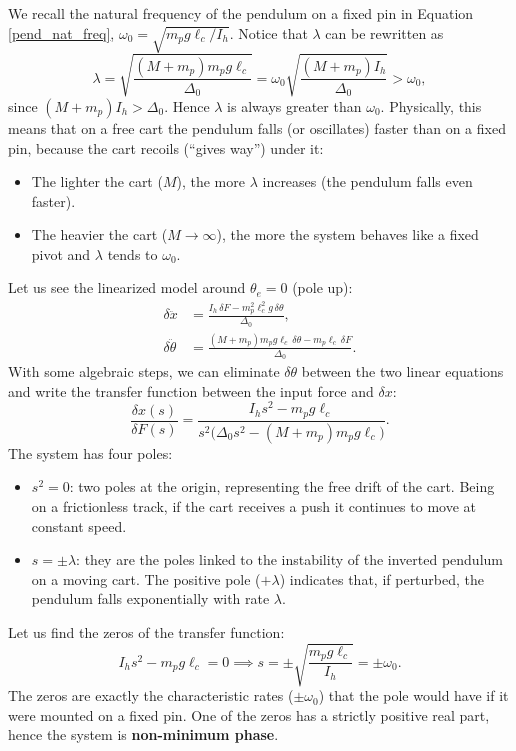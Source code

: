 \documentclass[10pt, a4paper]{report}
\begin{document}
We recall the natural frequency of the pendulum on a fixed pin in Equation \eqref{pend_nat_freq}, $\omega_0=\sqrt{m_pg\ell_c/I_h}$. Notice that $\lambda$ can be rewritten as
\begin{equation}
    \lambda = \sqrt{\frac{(M + m_p) m_p g \ell_c}{\Delta_0}} = \omega_0 \sqrt{\frac{(M + m_p) I_h}{\Delta_0}} > \omega_0 ,
\end{equation}
since $(M+m_p)I_h>\Delta_0$. Hence $\lambda$ is always greater than $\omega_0$. Physically, this means that on a free cart the pendulum falls (or oscillates) faster than on a fixed pin, because the cart recoils (``gives way'') under it:
\begin{itemize}
    \item The lighter the cart ($M$), the more $\lambda$ increases (the pendulum falls even faster).
    \item The heavier the cart ($M \to \infty$), the more the system behaves like a fixed pivot and $\lambda$ tends to $\omega_0$.
\end{itemize}
Let us see the linearized model around $\theta_e=0$ (pole up):
\begin{align}
\delta \ddot{x} &= \frac{I_h \, \delta F - m_p^2 \ell_c^2 g \, \delta \theta}{\Delta_0},\\
\delta \ddot{\theta} &= \frac{(M + m_p) m_p g \ell_c \, \delta \theta - m_p \ell_c \, \delta F}{\Delta_0}.
\end{align}
With some algebraic steps, we can eliminate $\delta\theta$ between the two linear equations and write the transfer function between the input force and $\delta x$:
\begin{equation}
    \frac{\delta x(s)}{\delta F(s)} = \frac{I_h s^2 - m_p g \ell_c}{s^2 \big(\Delta_0 s^2 - (M + m_p) m_p g \ell_c\big)}.
\end{equation}
The system has four poles:
\begin{itemize}
    \item $s^2=0$: two poles at the origin, representing the free drift of the cart. Being on a frictionless track, if the cart receives a push it continues to move at constant speed.
    \item $s=\pm\lambda$: they are the poles linked to the instability of the inverted pendulum on a moving cart. The positive pole ($+\lambda$) indicates that, if perturbed, the pendulum falls exponentially with rate $\lambda$.
\end{itemize}
Let us find the zeros of the transfer function:
\begin{equation}
    I_h s^2 - m_p g \ell_c = 0 \implies s = \pm \sqrt{\frac{m_p g \ell_c}{I_h}} = \pm \omega_0 .
\end{equation}
The zeros are exactly the characteristic rates ($\pm \omega_0$) that the pole would have if it were mounted on a fixed pin. One of the zeros has a strictly positive real part, hence the system is \textbf{non-minimum phase}.\bigskip
\end{document}
